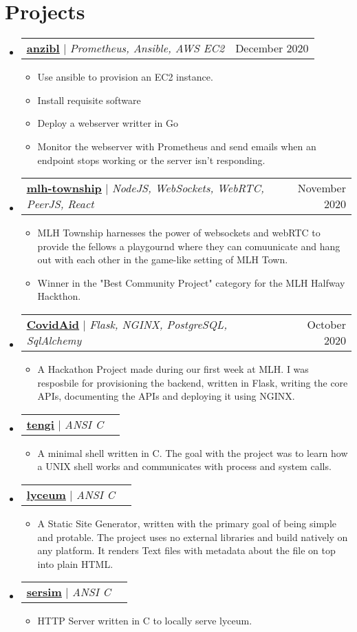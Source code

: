 \documentclass[letterpaper,11pt]{article}
\makeatletter
\newcommand{\resumeItem}[1]{
  \item\small{
    {#1 \vspace{-2pt}}
  }
}
\newcommand{\resumeProjectHeading}[2]{
    \item
    \begin{tabular*}{0.97\textwidth}{l@{\extracolsep{\fill}}r}
      \small#1 & #2 \\
    \end{tabular*}\vspace{-7pt}
}
\newcommand{\resumeSubHeadingListStart}{\begin{itemize}[leftmargin=0.15in, label={}]}
\newcommand{\resumeSubHeadingListEnd}{\end{itemize}}
\newcommand{\resumeItemListStart}{\begin{itemize}}
\newcommand{\resumeItemListEnd}{\end{itemize}\vspace{-5pt}}
\makeatother
\begin{document}
\section{Projects}
    \resumeSubHeadingListStart
      \resumeProjectHeading
		  {\href{https://github.com/awalvie/anzibl}{\underline{\textbf{anzibl}}} $|$ \emph{Prometheus, Ansible, AWS EC2}}{December 2020}
          \resumeItemListStart
            \resumeItem{Use ansible to provision an EC2 instance.}
            \resumeItem{Install requisite software}
            \resumeItem{Deploy a webserver writter in Go}
            \resumeItem{Monitor the webserver with Prometheus and send emails when an endpoint stops working or the server isn't responding.}
          \resumeItemListEnd
      \resumeProjectHeading
		  {\href{https://github.com/zerefwayne/mlh-township}{\underline{\textbf{mlh-township}}} $|$ \emph{NodeJS, WebSockets, WebRTC, PeerJS, React}}{November 2020}
          \resumeItemListStart
            \resumeItem{MLH Township harnesses the power of websockets and webRTC to provide the fellows a playgournd where they can comuunicate and hang out with each other in the game-like setting of MLH Town.}
			\resumeItem{Winner in the "Best Community Project" category for the MLH Halfway Hackthon.}
          \resumeItemListEnd
      \resumeProjectHeading
		  {\href{https://github.com/MLH-Fellowship/CovidAid}{\underline{\textbf{CovidAid}}} $|$ \emph{Flask, NGINX, PostgreSQL, SqlAlchemy}}{October 2020}
          \resumeItemListStart
            \resumeItem{A Hackathon Project made during our first week at MLH. I was resposbile for provisioning the backend, written in Flask, writing the core APIs, documenting the APIs and deploying it using NGINX.}
          \resumeItemListEnd
	  \resumeProjectHeading
		  {\href{https://github.com/awalvie/tengi}{\underline{\textbf{tengi}}} $|$ \emph{ANSI C}}{}
		  \resumeItemListStart
			\resumeItem{A minimal shell written in C. The goal with the project was to learn how a UNIX shell works and communicates with process and system calls.}
		  \resumeItemListEnd
	  \resumeProjectHeading
		  {\href{https://github.com/awalvie/lyceum}{\underline{\textbf{lyceum}}} $|$ \emph{ANSI C}}{}
		  \resumeItemListStart
			\resumeItem{A Static Site Generator, written with the primary goal of being simple and protable. The project uses no external libraries and build natively on any platform. It renders Text files with metadata about the file on top into plain HTML.}
		  \resumeItemListEnd
	  \resumeProjectHeading
		  {\href{https://github.com/awalvie/sersim}{\underline{\textbf{sersim}}} $|$ \emph{ANSI C}}{}
		  \resumeItemListStart
			\resumeItem{HTTP Server written in C to locally serve lyceum.}
		  \resumeItemListEnd
    \resumeSubHeadingListEnd
\end{document}
